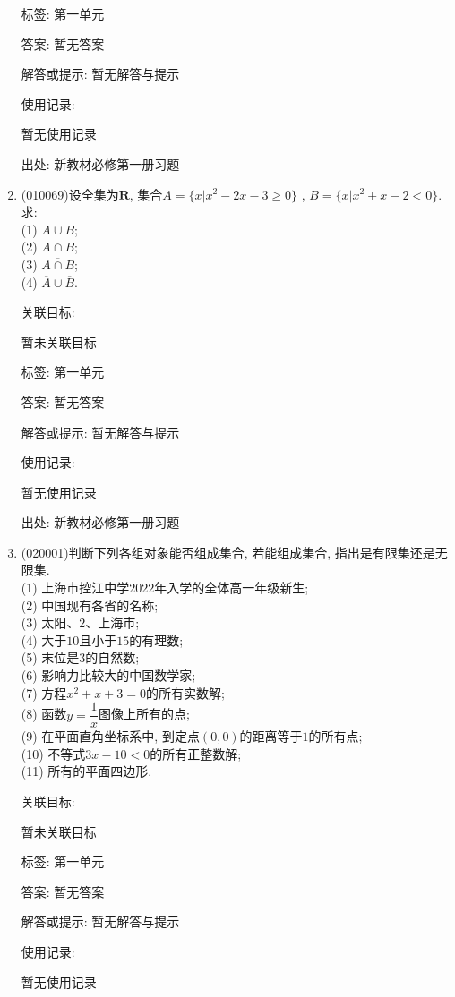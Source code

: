 \documentclass[10pt,a4paper]{article}
\begin{document}
\begin{enumerate}[1.]
标签: 第一单元

答案: 暂无答案

解答或提示: 暂无解答与提示

使用记录:

暂无使用记录


出处: 新教材必修第一册习题
\item { (010069)}设全集为$\mathbf{R}$, 集合$A=\{x|x^2-2x-3\ge 0\}$
, $B=\{x|x^2+x-2<0\}$. 求:\\
(1) $A\cup B$;\\
(2) $A\cap B$;\\
(3) $\overline{A\cap B}$;\\
(4) $\overline A\cup \overline B$.


关联目标:

暂未关联目标



标签: 第一单元

答案: 暂无答案

解答或提示: 暂无解答与提示

使用记录:

暂无使用记录


出处: 新教材必修第一册习题
\item { (020001)}判断下列各组对象能否组成集合, 若能组成集合, 指出是有限集还是无限集.\\
(1) 上海市控江中学$2022$年入学的全体高一年级新生;\\
(2) 中国现有各省的名称;\\
(3) 太阳、$2$、上海市;\\
(4) 大于$10$且小于$15$的有理数;\\
(5) 末位是$3$的自然数;\\
(6) 影响力比较大的中国数学家;\\
(7) 方程$x^2+x+3=0$的所有实数解;\\ 
(8) 函数$y=\dfrac 1x$图像上所有的点;\\ 
(9) 在平面直角坐标系中, 到定点$(0, 0)$的距离等于$1$的所有点;\\
(10) 不等式$3x-10<0$的所有正整数解;\\
(11) 所有的平面四边形.


关联目标:

暂未关联目标



标签: 第一单元

答案: 暂无答案

解答或提示: 暂无解答与提示

使用记录:

暂无使用记录



\end{enumerate}
\end{document}
